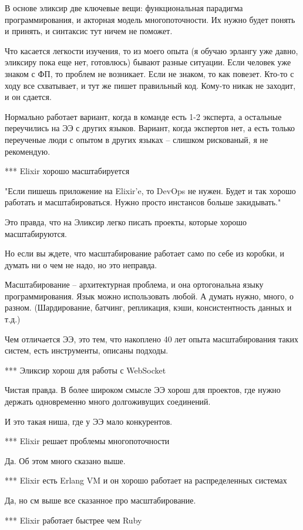 \documentclass[10pt]{beamer}
\begin{document}
В основе эликсир две ключевые вещи: функциональная парадигма программирования, и акторная модель многопоточности.
Их нужно будет понять и принять, и синтаксис тут ничем не поможет.

Что касается легкости изучения, то из моего опыта (я обучаю эрлангу уже давно, эликсиру пока еще нет, готовлюсь) бывают разные ситуации.
Если человек уже знаком с ФП, то проблем не возникает.
Если не знаком, то как повезет. Кто-то с ходу все схватывает, и тут же пишет правильный код. Кому-то никак не заходит, и он сдается.

Нормально работает вариант, когда в команде есть 1-2 эксперта, а остальные переучились на ЭЭ с других языков.
Вариант, когда экспертов нет, а есть только переученые люди с опытом в других языках -- слишком рискованый, я не рекомендую.


*** Elixir хорошо масштабируется

"Если пишешь приложение на Elixir'e, то DevOps не нужен. Будет и так хорошо работать и масштабироваться. Нужно просто инстансов больше закидывать."

Это правда, что на Эликсир легко писать проекты, которые хорошо масштабируются.

Но если вы ждете, что масштабирование работает само по себе из коробки, и думать ни о чем не надо, но это неправда.

Масштабирование -- архитектурная проблема, и она ортогональна языку программирования. Язык можно использовать любой. А думать нужно, много, о разном.
(Шардирование, батчинг, репликация, кэши, консистентность данных и т.д.)

Чем отличается ЭЭ, это тем, что накоплено 40 лет опыта масштабирования таких систем, есть инструменты, описаны подходы.


*** Эликсир хорош для работы с WebSocket

Чистая правда. В более широком смысле ЭЭ хорош для проектов, где нужно держать одновременно много долгоживущих соединений.

И это такая ниша, где у ЭЭ мало конкурентов.


*** Elixir решает проблемы многопоточности

Да. Об этом много сказано выше.


*** Elixir есть Erlang VM и он хорошо работает на распределенных системах

Да, но см выше все сказанное про масштабирование.


*** Elixir работает быстрее чем Ruby
\end{document}
